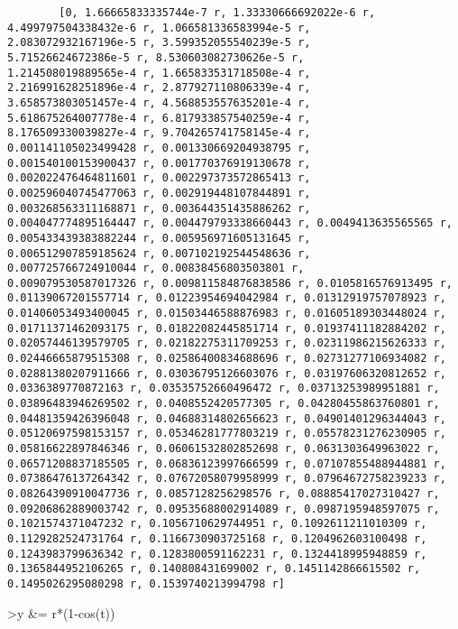 \documentclass[
]{book}
\begin{document}
\begin{verbatim}
        [0, 1.66665833335744e-7 r, 1.33330666692022e-6 r, 
4.499797504338432e-6 r, 1.066581336583994e-5 r, 
2.083072932167196e-5 r, 3.599352055540239e-5 r, 
5.71526624672386e-5 r, 8.530603082730626e-5 r, 
1.214508019889565e-4 r, 1.665833531718508e-4 r, 
2.216991628251896e-4 r, 2.877927110806339e-4 r, 
3.658573803051457e-4 r, 4.568853557635201e-4 r, 
5.618675264007778e-4 r, 6.817933857540259e-4 r, 
8.176509330039827e-4 r, 9.704265741758145e-4 r, 
0.001141105023499428 r, 0.001330669204938795 r, 
0.001540100153900437 r, 0.001770376919130678 r, 
0.002022476464811601 r, 0.002297373572865413 r, 
0.002596040745477063 r, 0.002919448107844891 r, 
0.003268563311168871 r, 0.003644351435886262 r, 
0.004047774895164447 r, 0.004479793338660443 r, 0.0049413635565565 r, 
0.005433439383882244 r, 0.005956971605131645 r, 
0.006512907859185624 r, 0.007102192544548636 r, 
0.007725766724910044 r, 0.00838456803503801 r, 
0.009079530587017326 r, 0.009811584876838586 r, 0.0105816576913495 r, 
0.01139067201557714 r, 0.01223954694042984 r, 0.01312919757078923 r, 
0.01406053493400045 r, 0.01503446588876983 r, 0.01605189303448024 r, 
0.01711371462093175 r, 0.01822082445851714 r, 0.01937411182884202 r, 
0.02057446139579705 r, 0.02182275311709253 r, 0.02311986215626333 r, 
0.02446665879515308 r, 0.02586400834688696 r, 0.02731277106934082 r, 
0.02881380207911666 r, 0.03036795126603076 r, 0.03197606320812652 r, 
0.0336389770872163 r, 0.03535752660496472 r, 0.03713253989951881 r, 
0.03896483946269502 r, 0.0408552420577305 r, 0.04280455863760801 r, 
0.04481359426396048 r, 0.04688314802656623 r, 0.04901401296344043 r, 
0.05120697598153157 r, 0.05346281777803219 r, 0.05578231276230905 r, 
0.05816622897846346 r, 0.06061532802852698 r, 0.0631303649963022 r, 
0.06571208837185505 r, 0.06836123997666599 r, 0.07107855488944881 r, 
0.07386476137264342 r, 0.07672058079958999 r, 0.07964672758239233 r, 
0.08264390910047736 r, 0.0857128256298576 r, 0.08885417027310427 r, 
0.09206862889003742 r, 0.09535688002914089 r, 0.0987195948597075 r, 
0.1021574371047232 r, 0.1056710629744951 r, 0.1092611211010309 r, 
0.1129282524731764 r, 0.1166730903725168 r, 0.1204962603100498 r, 
0.1243983799636342 r, 0.1283800591162231 r, 0.1324418995948859 r, 
0.1365844952106265 r, 0.140808431699002 r, 0.1451142866615502 r, 
0.1495026295080298 r, 0.1539740213994798 r]
\end{verbatim}

\textgreater y \&= r*(1-cos(t))
\end{document}
